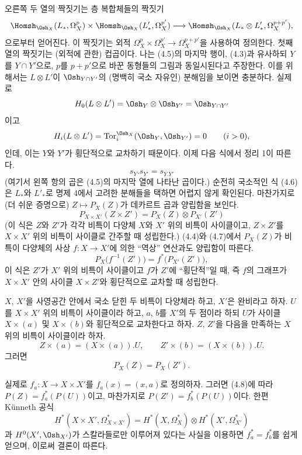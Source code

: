 오른쪽 두 열의 짝짓기는 층 복합체들의 짝짓기
\[
\Homsh_{\Osh_X}(L_{*},\Omega_X^{p})
\times\Homsh_{\Osh_X}(L'_{*},\Omega_X^{p'})
\longrightarrow
\Homsh_{\Osh_X}(L_{*}\otimes L'_{*},\Omega_X^{p+p'}),
\]
으로부터 얻어진다. 이 짝짓기는 외적
$\Omega_X^{p}\times\Omega_X^{p'}\longrightarrow\Omega_X^{p+p'}$을 사용하여
정의한다. 첫째 열의 짝짓기는 (외적에 관한) 컵곱이다. 나는 (4.5)의
마지막 행이, (4.3)과 유사하되 $Y$를 $Y\cap Y'$으로, $p$를 $p+p'$으로
바꾼 동형들의 그림과 동일시된다고 주장한다. 이를 위해서는
$L\otimes L'$이 $\Osh_{Y\cap Y'}$의 (명백히 국소 자유인) 분해임을
보이면 충분하다. 실제로
\[
  H_0(L\otimes L')=\Osh_Y\otimes\Osh_{Y'}=\Osh_{Y\cap Y'}
\]
이고
\[
  H_i(L\otimes L')=\operatorname{Tor}_{i}^{\Osh_X}(\Osh_Y,\Osh_{Y'})=0
  \qquad(i>0),
\]
인데, 이는 $Y$와 $Y'$가 횡단적으로 교차하기 때문이다. 이제 다음 식에서
정리 1이 따른다.
\begin{equation}\tag{4.6}
  s_Y.s_{Y'}=s_{Y.Y'}
\end{equation}
(여기서 왼쪽 항의 곱은 (4.5)의 마지막 열에 나타난 곱이다.) 순전히
국소적인 식 (4.6)은 $L_{*}$와 $L'_{*}$로 명제 4에서 고려한 분해들을
택하면 어렵지 않게 확인된다. 마찬가지로 (더 쉬운 증명으로)
$Z\longmapsto P_X(Z)$가 데카르트 곱과 양립함을 보인다.
\begin{equation}\tag{4.7}
  P_{X\times X'}(Z\times Z')=P_X(Z)\otimes P_{X'}(Z')
\end{equation}
(이 식은 $Z$와 $Z'$가 각각 비특이 다양체 $X$와 $X'$ 위의 비특이
사이클이고, $Z\times Z'$를 $X\times X'$ 위의 비특이 사이클로 간주할 때
성립한다.) (4.4)와 (4.7)에서 $P_X(Z)$가 비특이 다양체의 사상
$f:X\longrightarrow X'$에 의한 ``역상'' 연산과도 양립함이 따른다.
\begin{equation}\tag{4.8}
  P_X\bigl(f^{-1}(Z')\bigr)=f^{*}\bigl(P_{X'}(Z')\bigr),
\end{equation}
이 식은 $Z'$가 $X'$ 위의 비특이 사이클이고 $f$가 $Z'$에 ``횡단적''일 때,
즉 $f$의 그래프가 $X\times X'$ 안의 사이클 $X\times Z'$와 횡단적으로
교차할 때 성립한다.

 $X$, $X'$을 사영공간 안에서 국소 닫힌 두 비특이
다양체라 하고, $X'$은 완비라고 하자. $U$를 $X\times X'$ 위의 비특이
사이클이라 하고, $a$, $b$를 $X'$의 두 점이라 하되 $U$가 사이클
$X\times(a)$ 및 $X\times(b)$와 횡단적으로 교차한다고 하자. $Z$, $Z'$을
다음을 만족하는 $X$ 위의 비특이 사이클이라 하자.
\[
  Z\times(a)=(X\times(a)).U,
  \qquad
  Z'\times(b)=(X\times(b)).U.
\]
그러면
\[
  P_X(Z)=P_X(Z').
\]

실제로 $f_a:X\longrightarrow X\times X'$를 $f_a(x)=(x,a)$로 정의하자.
그러면 (4.8)에 따라 $P(Z)=f_a^{*}(P(U))$이고, 마찬가지로
$P(Z')=f_b^{*}(P(U))$이다. 한편 K\"unneth 공식
\[
  H^{*}(X\times X',\Omega_{X\times X'}^{*})
  =H^{*}(X,\Omega_X^{*})\otimes H^{*}(X',\Omega_{X'}^{*})
\]
과 $H^{0}(X',\Osh_{X'})$가 스칼라들로만 이루어져 있다는 사실을
이용하면 $f_a^{*}=f_b^{*}$를 쉽게 얻으며, 이로써 결론이 따른다.

